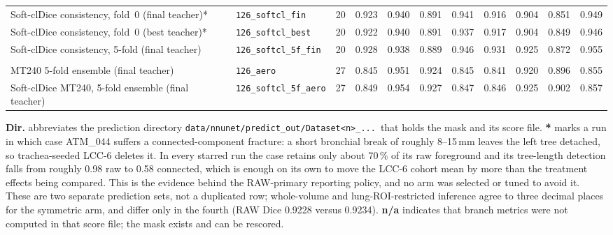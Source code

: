 \begin{table}[htbp]
\begin{tabular}{llcrrrrrrrr}
    \quad Soft-clDice consistency, fold~0 (final teacher)* & \texttt{126\_softcl\_fin} & 20 & 0.923 & 0.940 & 0.891 & 0.941 & 0.916 & 0.904 & 0.851 & 0.949 \\
    \quad Soft-clDice consistency, fold~0 (best teacher)* & \texttt{126\_softcl\_best} & 20 & 0.922 & 0.940 & 0.891 & 0.937 & 0.917 & 0.904 & 0.849 & 0.946 \\
    \quad Soft-clDice consistency, 5-fold (final teacher) & \texttt{126\_softcl\_5f\_fin} & 20 & 0.928 & 0.938 & 0.889 & 0.946 & 0.931 & 0.925 & 0.872 & 0.955 \\
    \addlinespace
    \multicolumn{11}{l}{\itshape External out-of-distribution evaluation (AeroPath, 27 cases)} \\
    \quad MT240 5-fold ensemble (final teacher) & \texttt{126\_aero} & 27 & 0.845 & 0.951 & 0.924 & 0.845 & 0.841 & 0.920 & 0.896 & 0.855 \\
    \quad Soft-clDice MT240, 5-fold ensemble (final teacher) & \texttt{126\_softcl\_5f\_aero} & 27 & 0.849 & 0.954 & 0.927 & 0.847 & 0.846 & 0.925 & 0.902 & 0.857 \\
    \bottomrule
  \end{tabular}

  \medskip
  \begin{minipage}{\textwidth}
    \footnotesize
    \textbf{Dir.} abbreviates the prediction directory
    \texttt{data/nnunet/predict\_out/Dataset<n>\_...}\ that holds the mask and its score file.
    \textbf{*} marks a run in which case ATM\_044 suffers a connected-component fracture: a short
    bronchial break of roughly 8--15\,mm leaves the left tree detached, so trachea-seeded LCC-6
    deletes it. In every starred run the case retains
    only about 70\,\% of its raw foreground and its tree-length detection falls from roughly 0.98
    raw to 0.58 connected, which is enough on its own to move the LCC-6 cohort mean by more than
    the treatment effects being compared. This is the evidence behind the RAW-primary reporting
    policy, and no arm was selected or tuned to avoid it.
    \textbf{\ddag} These are two separate prediction sets, not a duplicated row; whole-volume and
    lung-ROI-restricted inference agree to three decimal places for the symmetric arm, and differ
    only in the fourth (RAW Dice 0.9228 versus 0.9234).
    \textbf{n/a} indicates that branch metrics were not computed in that score file; the mask exists
    and can be rescored.
  \end{minipage}
\end{table}

